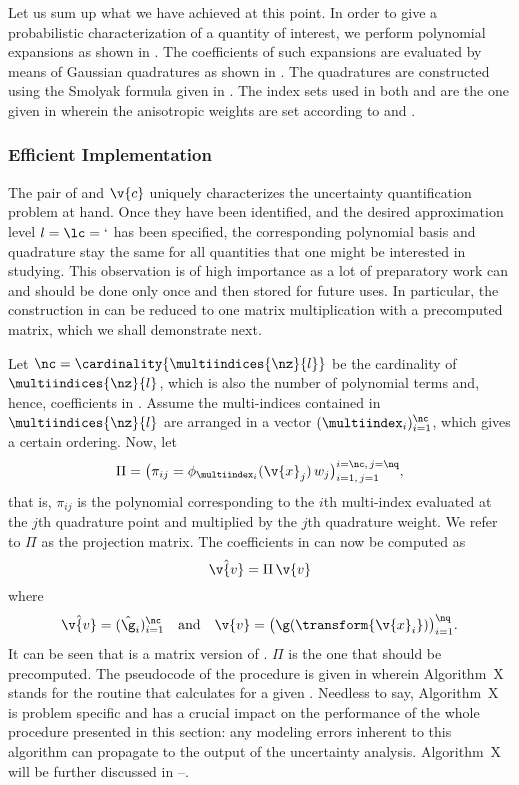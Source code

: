 Let us sum up what we have achieved at this point. In order to give a
probabilistic characterization of a quantity of interest, we perform polynomial
expansions as shown in . The coefficients of such
expansions are evaluated by means of Gaussian quadratures as shown in
. The quadratures are constructed using the Smolyak
formula given in . The index sets used in both
 and  are the one given
in  wherein the anisotropic weights are
set according to  and .

\subsubsection{Efficient Implementation}

The pair of \vz and $\v{c}$ uniquely characterizes the uncertainty
quantification problem at hand. Once they have been identified, and the desired
approximation level $l = \lc = \lq$ has been specified, the corresponding
polynomial basis and quadrature stay the same for all quantities that one might
be interested in studying. This observation is of high importance as a lot of
preparatory work can and should be done only once and then stored for future
uses. In particular, the construction in  can be
reduced to one matrix multiplication with a precomputed matrix, which we shall
demonstrate next.

Let $\nc = \cardinality{\multiindices{\nz}{l}}$ be the cardinality of
$\multiindices{\nz}{l}$, which is also the number of polynomial terms and,
hence, coefficients in . Assume the multi-indices
contained in $\multiindices{\nz}{l}$ are arranged in a vector
$(\multiindex_i)_{i = 1}^\nc$, which gives a certain ordering. Now, let
\[
  \Pi = \big( \pi_{ij} = \phi_{\multiindex_i}(\v{x}_j) \, w_j \big)_{i = 1, \, j = 1}^{i = \nc, \, j = \nq},
\]
that is, $\pi_{ij}$ is the polynomial corresponding to the $i$th multi-index
evaluated at the $j$th quadrature point and multiplied by the $j$th quadrature
weight. We refer to $\Pi$ as the projection matrix. The coefficients in
 can now be computed as
\[
  \hat{\v{v}} = \Pi \, \v{v}
\]
where
\[
  \hat{\v{v}} = (\hat{\g}_i)_{i = 1}^\nc \hspace{1em} \text{and} \hspace{1em}
  \v{v} = \big(\g(\transform{\v{x}_i}) \big)_{i = 1}^\nq.
\]
It can be seen that  is a matrix version of
. $\Pi$ is the one that should be precomputed. The
pseudocode of the procedure is given in  wherein
Algorithm~X stands for the routine that calculates \g for a given \vu. Needless
to say, Algorithm~X is problem specific and has a crucial impact on the
performance of the whole procedure presented in this section: any modeling
errors inherent to this algorithm can propagate to the output of the uncertainty
analysis. Algorithm~X will be further discussed in
--.

